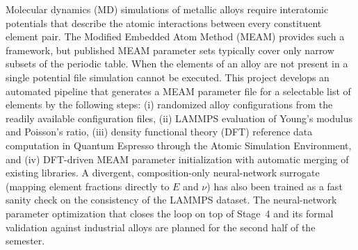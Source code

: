 \begin{boxedabstract}
\small
Molecular dynamics (MD) simulations of metallic alloys require interatomic
potentials that describe the atomic interactions between every constituent element pair.
The Modified Embedded Atom Method (MEAM) provides such a framework, but
published MEAM parameter sets typically cover only narrow subsets of the periodic
table. When the elements of an alloy are not present in a single potential file simulation cannot be executed. This
project develops an automated pipeline that generates a MEAM parameter
file for a selectable list of elements by the following steps: (i) randomized alloy
configurations from the readily available configuration files, (ii) LAMMPS evaluation of Young's modulus and Poisson's ratio,
(iii) density functional theory (DFT) reference data computation in Quantum Espresso
through the Atomic Simulation Environment, and (iv) DFT-driven MEAM parameter
initialization with automatic merging of existing libraries. A divergent, composition-only neural-network
surrogate (mapping element fractions directly to $E$ and $\nu$) has also been
trained as a fast sanity check on the consistency of the LAMMPS dataset. The
neural-network parameter optimization that closes the loop on top of Stage~4 and
its formal validation against industrial alloys are planned for the second
half of the semester.
\vspace{0.5em}
\end{boxedabstract}
